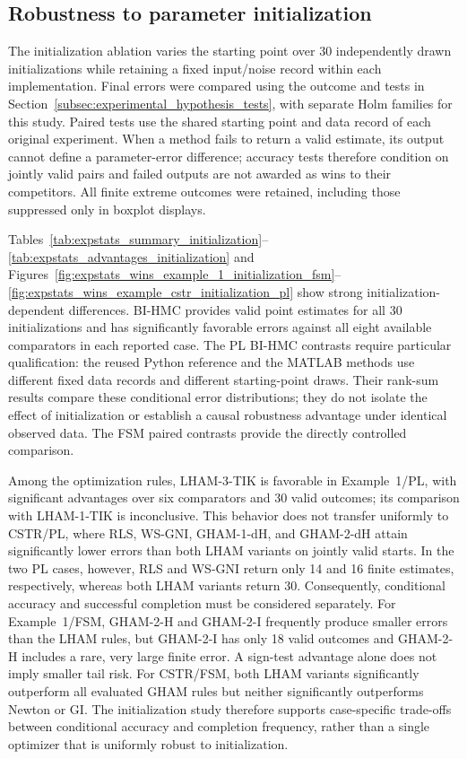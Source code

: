 \subsection{Robustness to parameter initialization}
\label{subsec:experimental_initialization_statistics}
The initialization ablation varies the starting point over 30 independently
drawn initializations while retaining a fixed input/noise record within
each implementation. Final errors were compared using the outcome and
tests in Section~\ref{subsec:experimental_hypothesis_tests}, with separate
Holm families for this study. Paired tests use the shared starting point
and data record of each original experiment. When a method fails to return
a valid estimate, its output cannot define a parameter-error difference;
accuracy tests therefore condition on jointly valid pairs and failed
outputs are not awarded as wins to their competitors. All finite extreme
outcomes were retained, including those suppressed only in boxplot displays.

Tables~\ref{tab:expstats_summary_initialization}--
\ref{tab:expstats_advantages_initialization} and
Figures~\ref{fig:expstats_wins_example_1_initialization_fsm}--
\ref{fig:expstats_wins_example_cstr_initialization_pl} show strong
initialization-dependent differences. BI-HMC provides valid point estimates
for all 30 initializations and has significantly favorable errors against
all eight available comparators in each reported case. The PL BI-HMC
contrasts require particular qualification: the reused Python reference
and the MATLAB methods use different fixed data records and different
starting-point draws. Their rank-sum results compare these conditional
error distributions; they do not isolate the effect of initialization
or establish a causal robustness advantage under identical observed data.
The FSM paired contrasts provide the directly controlled comparison.

Among the optimization rules, LHAM-3-TIK is favorable in Example~1/PL,
with significant advantages over six comparators and 30 valid outcomes;
its comparison with LHAM-1-TIK is inconclusive. This behavior does not
transfer uniformly to CSTR/PL, where RLS, WS-GNI, GHAM-1-dH, and
GHAM-2-dH attain significantly lower errors than both LHAM variants on
jointly valid starts. In the two PL cases, however, RLS and WS-GNI return
only 14 and 16 finite estimates, respectively, whereas both LHAM variants
return 30. Consequently, conditional accuracy and successful completion
must be considered separately. For Example~1/FSM, GHAM-2-H and GHAM-2-I
frequently produce smaller errors than the LHAM rules, but GHAM-2-I has
only 18 valid outcomes and GHAM-2-H includes a rare, very large finite
error. A sign-test advantage alone does not imply smaller tail risk.
For CSTR/FSM, both LHAM variants significantly outperform all evaluated
GHAM rules but neither significantly outperforms Newton or GI.
The initialization study therefore supports case-specific trade-offs
between conditional accuracy and completion frequency, rather than a
single optimizer that is uniformly robust to initialization.

